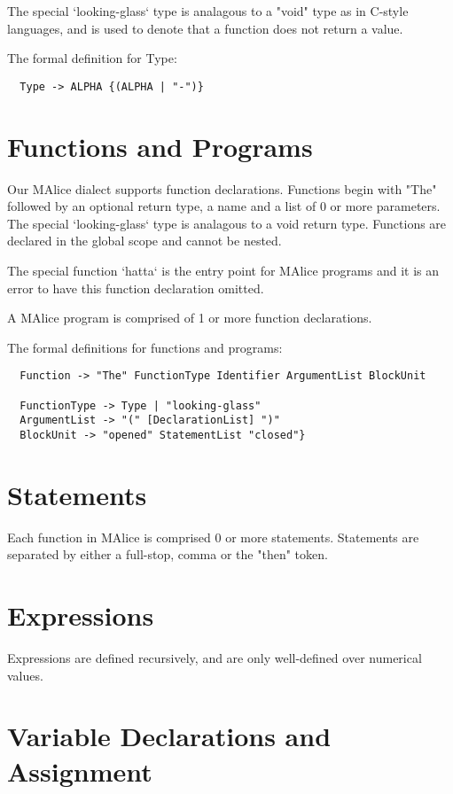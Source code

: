 \documentclass[a4wide, 11pt]{article}
\begin{document}
The special `looking-glass` type is analagous to a "void" type as in C-style languages, and is used to denote that a function does not return a value.

The formal definition for Type:
\begin{verbatim}
  Type -> ALPHA {(ALPHA | "-")}
\end{verbatim}

\section{Functions and Programs}

Our MAlice dialect supports function declarations. Functions begin with "The" followed by an optional return type, a name and a list of 0 or more parameters. The special `looking-glass` type is analagous to a void return type. Functions are declared in the global scope and cannot be nested.

The special function `hatta` is the entry point for MAlice programs and it is an error to have this function declaration omitted.

A MAlice program is comprised of 1 or more function declarations.

The formal definitions for functions and programs:

\begin{verbatim}
  Function -> "The" FunctionType Identifier ArgumentList BlockUnit

  FunctionType -> Type | "looking-glass"
  ArgumentList -> "(" [DeclarationList] ")"
  BlockUnit -> "opened" StatementList "closed"}
\end{verbatim}

\section{Statements}

Each function in MAlice is comprised 0 or more statements. Statements are separated by either a full-stop, comma or the "then" token.
  
\section{Expressions}

Expressions are defined recursively, and are only well-defined over numerical values.

\section{Variable Declarations and Assignment}
\end{document}
